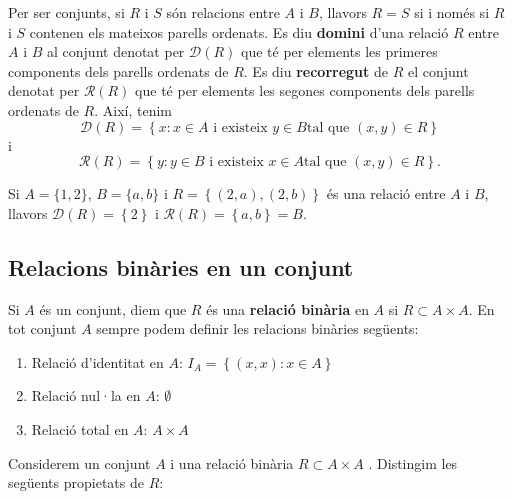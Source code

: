 Per ser conjunts, si $R$ i $S$ són relacions entre $A$ i $B$, llavors 
$R=S$ si i només si $R$ i $S$ contenen els mateixos parells ordenats. Es
diu \textbf{domini} d'una relació $R$ entre $A$ i $B$ al conjunt denotat
per $\mathcal{D}\left( R\right) $ que té per elements les primeres
components dels parells ordenats de $R$. Es diu \textbf{recorregut} de $R$
el conjunt denotat per $\mathcal{R}\left( R\right) $ que té per elements
les segones components dels parells ordenats de $R$. Així, tenim%
\begin{equation*}
\mathcal{D}\left( R\right) =\left\{ x:x\in A\text{ i existeix }y\in B\text{
tal que }(x,y)\in R\right\}
\end{equation*}
i%
\begin{equation*}
\mathcal{R}\left( R\right) =\left\{ y:y\in B\text{ i existeix }x\in A\text{
tal que }(x,y)\in R\right\} \text{.}
\end{equation*}

\begin{exemple}
Si $A=\{1,2\}$, $B=\{a,b\}$ i $R=\left\{ (2,a),(2,b)\right\} $ és una
relació entre $A$ i $B$, llavors $\mathcal{D}\left( R\right) =\left\{
2\right\} $ i $\mathcal{R}\left( R\right) =\left\{ a,b\right\} =B$.
\end{exemple}

\subsection{Relacions binàries en un conjunt}

Si $A$ és un conjunt, diem que $R$ és una \textbf{relació binària} en $A$ si $R\subset A\times A$. En tot conjunt $A$ sempre podem
definir les relacions binàries següents:

\begin{enumerate}
\item Relació d'identitat en $A$: $I_{A}=\left\{ (x,x):x\in A\right\} $

\item Relació nul·la en $A$: $\emptyset$

\item Relació total en $A$: $A\times A$
\end{enumerate}

\bigskip

Considerem un conjunt $A$ i una relació binària $R\subset A\times A$%
. Distingim les següents propietats de $R$:

